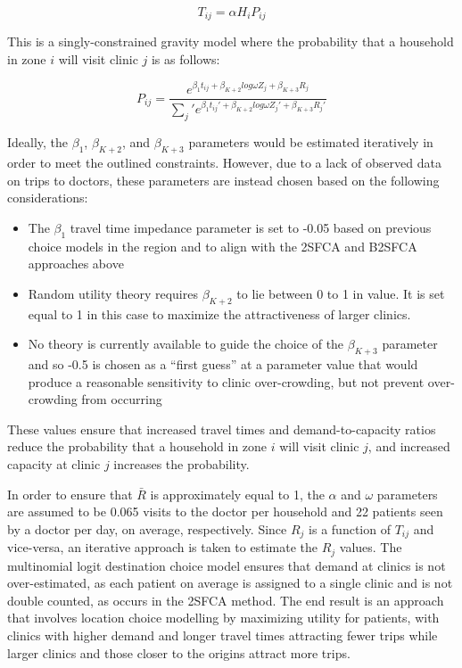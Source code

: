 \documentclass{article}
\begin{document}
\[
T_{ij} = \alpha H_i P_{ij}
\]

This is a singly-constrained gravity model where the probability that a
household in zone \(i\) will visit clinic \(j\) is as follows:

\[
P_{ij} = \frac{e^{\beta_1 t_{ij} + \beta_{K+2} log \omega Z_j + \beta_{K + 3} R_j}}{\sum_j\prime e^{\beta_1 t_{ij}\prime + \beta_{K+2} log \omega Z_j\prime + \beta_{K + 3} R_j\prime}}
\]

Ideally, the \(\beta_1\), \(\beta_{K+2}\), and \(\beta_{K + 3}\)
parameters would be estimated iteratively in order to meet the outlined
constraints. However, due to a lack of observed data on trips to
doctors, these parameters are instead chosen based on the following
considerations:

\begin{itemize}
\tightlist
\item
  The \(\beta_1\) travel time impedance parameter is set to -0.05 based
  on previous choice models in the region and to align with the 2SFCA
  and B2SFCA approaches above
\item
  Random utility theory requires \(\beta_{K+2}\) to lie between 0 to 1
  in value. It is set equal to 1 in this case to maximize the
  attractiveness of larger clinics.
\item
  No theory is currently available to guide the choice of the
  \(\beta_{K+3}\) parameter and so -0.5 is chosen as a ``first guess''
  at a parameter value that would produce a reasonable sensitivity to
  clinic over-crowding, but not prevent over-crowding from occurring
\end{itemize}

These values ensure that increased travel times and demand-to-capacity
ratios reduce the probability that a household in zone \(i\) will visit
clinic \(j\), and increased capacity at clinic \(j\) increases the
probability.

In order to ensure that \(\bar{R}\) is approximately equal to 1, the
\(\alpha\) and \(\omega\) parameters are assumed to be 0.065 visits to
the doctor per household and 22 patients seen by a doctor per day, on
average, respectively. Since \(R_j\) is a function of \(T_{ij}\) and
vice-versa, an iterative approach is taken to estimate the \(R_j\)
values. The multinomial logit destination choice model ensures that
demand at clinics is not over-estimated, as each patient on average is
assigned to a single clinic and is not double counted, as occurs in the
2SFCA method. The end result is an approach that involves location
choice modelling by maximizing utility for patients, with clinics with
higher demand and longer travel times attracting fewer trips while
larger clinics and those closer to the origins attract more trips.
\end{document}
